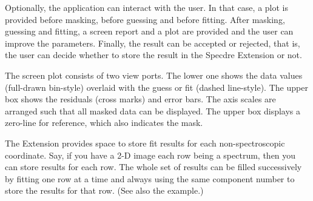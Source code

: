 {{      Optionally, the application can interact with the user. In that
      case, a plot is provided before masking, before guessing and
      before fitting. After masking, guessing and fitting, a screen
      report and a plot are provided and the user can improve the
      parameters. Finally, the result can be accepted or rejected, that
      is, the user can decide whether to store the result in the Specdre
      Extension or not.

      The screen plot consists of two view ports. The lower one shows the
      data values (full-drawn bin-style) overlaid with the guess or fit
      (dashed line-style). The upper box shows the residuals (cross
      marks) and error bars. The axis scales are arranged such that
      all masked data can be displayed. The upper box displays a
      zero-line for reference, which also indicates the mask.

      The Extension provides space to store fit results for each
      non-spectroscopic coordinate. Say, if you have a 2-D image each
      row being a spectrum, then you can store results for each row. The
      whole set of results can be filled successively by fitting one row
      at a time and always using the same component number to store the
      results for that row. (See also the example.)

}}
